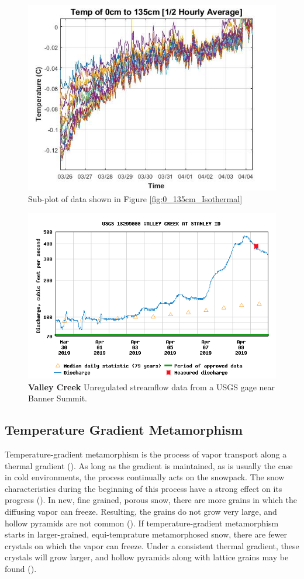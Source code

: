  \begin{figure}
    \centering
    \includegraphics[width=0.7\linewidth]{figures/0_135cm_zoom.jpg}
    \caption{Sub-plot of data shown in Figure \ref{fig:0_135cm_Isothermal}}
    \label{fig:0_135cm_Zoom}
 \end{figure}

\begin{figure}
    \centering
    \includegraphics[width=0.8\linewidth]{figures/ValleyCreek_Gage.png}
    \caption{\textbf{Valley Creek} Unregulated streamflow data from a USGS gage near Banner Summit.}
    \label{fig:ValleyCreek}
 \end{figure}

\subsection{Temperature Gradient Metamorphism}
Temperature-gradient metamorphism is the process of vapor transport along a thermal gradient (\cite{sommerfeld_1970}). As long as the gradient is maintained, as is usually the case in cold environments, the process continually acts on the snowpack. The snow characteristics during the beginning of this process have a strong effect on its progress (\cite{sommerfeld_1970}). In new, fine grained, porous snow, there are more grains in which the diffusing vapor can freeze. Resulting, the grains do not grow very large, and hollow pyramids are not common (\cite{sommerfeld_1970}). If temperature-gradient metamorphism starts in larger-grained, equi-temprature metamorphosed snow, there are fewer crystals on which the vapor can freeze. Under a consistent thermal gradient, these crystals will grow larger, and hollow pyramids along with lattice grains may be found (\cite{akitaya_1967}). 



